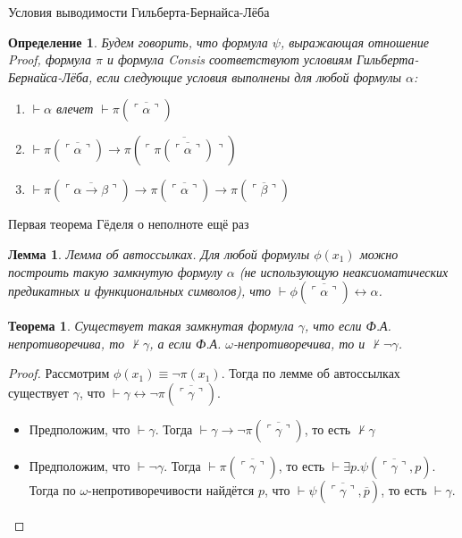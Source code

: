 \documentclass[aspectratio=169]{beamer}
\newtheorem{thm}{Теорема}[section]
\newtheorem{dfn}{Определение}[section]
\newtheorem{lmm}{Лемма}[section]
\begin{document}
\begin{frame}{Условия выводимости Гильберта-Бернайса-Лёба}
\begin{dfn}
Будем говорить, что формула $\psi$, выражающая отношение Proof, 
формула $\pi$ и формула Consis соответствуют
условиям Гильберта-Бернайса-Лёба, если следующие условия выполнены для любой формулы $\alpha$:

\begin{enumerate}
\item $\vdash \alpha$ влечет $\vdash \pi(\overline{\ulcorner\alpha\urcorner})$
\item $\vdash \pi (\overline{\ulcorner\alpha\urcorner}) \rightarrow \pi(\overline{\ulcorner\pi(\overline{\ulcorner\alpha\urcorner})\urcorner})$
\item $\vdash \pi (\overline{\ulcorner\alpha\rightarrow \beta\urcorner}) \rightarrow \pi(\overline{\ulcorner\alpha\urcorner}) \rightarrow \pi(\overline{\ulcorner\beta\urcorner})$
\end{enumerate}
\end{dfn}
\end{frame}

\begin{frame}{Первая теорема Гёделя о неполноте ещё раз}
\begin{lmm}Лемма об автоссылках. Для любой формулы $\phi(x_1)$ можно построить 
такую замкнутую формулу $\alpha$ (не использующую неаксиоматических предикатных
и функциональных символов), что $\vdash \phi(\overline{\ulcorner\alpha\urcorner}) \leftrightarrow \alpha$.
\end{lmm}

\begin{thm}Существует такая замкнутая формула $\gamma$, что если Ф.А. непротиворечива, то 
$\not\vdash \gamma$, а если Ф.А. $\omega$-непротиворечива, то и $\not\vdash\neg\gamma$.
\end{thm}
\begin{proof}Рассмотрим $\phi(x_1) \equiv \neg\pi(x_1)$. Тогда по лемме об автоссылках существует
$\gamma$, что $\vdash \gamma \leftrightarrow \neg\pi(\overline{\ulcorner\gamma\urcorner})$.

\begin{itemize}
\item Предположим, что $\vdash \gamma$. Тогда $\vdash \gamma \rightarrow \neg\pi(\overline{\ulcorner\gamma\urcorner})$, то есть $\not\vdash\gamma$
\item Предположим, что $\vdash \neg\gamma$. Тогда $\vdash \pi(\overline{\ulcorner\gamma\urcorner})$,
то есть $\vdash \exists p.\psi(\overline{\ulcorner\gamma\urcorner},p)$. Тогда по $\omega$-непротиворечивости
найдётся $p$, что $\vdash \psi(\overline{\ulcorner\gamma\urcorner},\overline{p})$, то есть $\vdash \gamma$.
\end{itemize}
\end{proof}
\end{frame}
\end{document}
